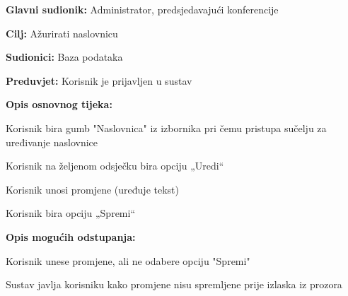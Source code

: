 					\noindent {}
					\begin{packed_item}
						\item \textbf{Glavni sudionik:} Administrator, predsjedavajući konferencije
						\item \textbf{Cilj:} Ažurirati naslovnicu
						\item \textbf{Sudionici:} Baza podataka
						\item \textbf{Preduvjet:} Korisnik je prijavljen u sustav
						
						\item \textbf{Opis osnovnog tijeka:} 
						\item[] \begin{packed_enum}
							\item Korisnik bira gumb "Naslovnica" iz izbornika pri čemu pristupa sučelju za uređivanje naslovnice
							\item Korisnik na željenom odsječku bira opciju „Uredi“
							\item Korisnik unosi promjene (uređuje tekst)
							\item Korisnik bira opciju „Spremi“
						\end{packed_enum}
					
						\item \textbf{Opis mogućih odstupanja:}
						\item[] \begin{packed_enum}

							\item[2.a] Korisnik unese promjene, ali ne odabere opciju "Spremi"
							\item[] \begin{packed_enum}
								\item[1.] Sustav javlja korisniku kako promjene nisu spremljene prije izlaska iz prozora
							\end{packed_enum}
							
						\end{packed_enum}
					\end{packed_item}

